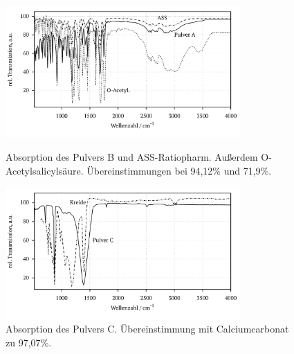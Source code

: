 \documentclass[a4paper,10pt,twocolumn]{article}
\begin{document}
		\begin{figure}[h]
		\centering
			\includegraphics[width=0.8\textwidth]{Gruppe2A/pulver_b.pdf}				\caption{Absorption des Pulvers B und ASS-Ratiopharm. Au{\ss}erdem O-Acetylsalicyls\"aure. \"Ubereinstimmungen bei 94,12\% und 71,9\%.}\label{img:b}
			\includegraphics[width=0.8\textwidth]{Gruppe2A/pulver_c.pdf}				\caption{Absorption des Pulvers C. \"Ubereinstimmung mit Calciumcarbonat zu 97,07\%.}\label{img:c}
		\end{figure}
\end{document}

